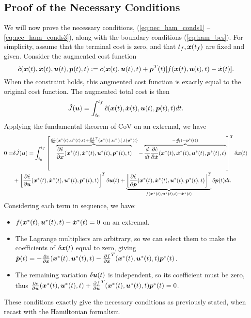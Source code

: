 \subsection{Proof of the Necessary Conditions}

We will now prove the necessary conditions, (\ref{eq:nec_ham_conds1} -- \ref{eq:nec_ham_conds3}), along with the boundary conditions (\ref{eq:ham_bcs}). For simplicity, assume that the terminal cost is zero, and that $t_f, \bm{x}(t_f)$ are fixed and given. Consider the augmented cost function 
\begin{equation}
\hat{c}(\bm{x}(t), \dot{\bm{x}}(t), \bm{u}(t), \bm{p}(t),t) \vcentcolon= c(\bm{x}(t),\bm{u}(t),t) + \bm{p}^T(t) [f(\bm{x}(t),\bm{u}(t),t) - \dot{\bm{x}}(t)].
\end{equation}
When the constraint holds, this augmented cost function is exactly equal to the original cost function. The augmented total cost is then
\begin{equation}
    \hat{J}(\bm{u}) = \int_{t_0}^{t_f} \hat{c}(\bm{x}(t), \dot{\bm{x}}(t), \bm{u}(t), \bm{p}(t),t) dt.
\end{equation}
Applying the fundamental theorem of CoV on an extremal, we have
\begin{align}
    0 = &\delta \hat{J}(\bm{u}) = \int_{t_0}^{t_f} \left[ \overbrace{\frac{\partial \hat{c}}{\partial \bm{x}}(\bm{x}^*(t), \dot{\bm{x}}^*(t), \bm{u}^*(t), \bm{p}^*(t),t)}^{\frac{\partial c}{\partial \bm{x}}(\bm{x}^*(t),  \bm{u}^*(t), t) + \frac{\partial f}{\partial \bm{x}}^T(\bm{x}^*(t),  \bm{u}^*(t), t)\bm{p}^*(t)} - \overbrace{\frac{d}{dt} \frac{\partial \hat{c}}{\partial \dot{\bm{x}}}(\bm{x}^*(t), \dot{\bm{x}}^*(t), \bm{u}^*(t), \bm{p}^*(t),t)}^{-\frac{d}{dt}(-\bm{p}^*(t))} \right]^T \delta \bm{x}(t) \\
    & + \left[ \frac{\partial \hat{c}}{\partial \bm{u}}(\bm{x}^*(t), \dot{\bm{x}}^*(t), \bm{u}^*(t), \bm{p}^*(t),t)\right]^T \delta \bm{u}(t) + \underbrace{\left[\frac{\partial \hat{c}}{\partial \bm{p}}(\bm{x}^*(t), \dot{\bm{x}}^*(t), \bm{u}^*(t), \bm{p}^*(t),t) \right]^T }_{f(\bm{x}^*(t),\bm{u}^*(t),t) - \dot{\bm{x}}^*(t)} \delta \bm{p}(t) dt \nonumber.
\end{align}
Considering each term in sequence, we have:
\begin{itemize}
    \item $f(\bm{x}^*(t),\bm{u}^*(t),t) - \dot{\bm{x}}^*(t) = 0$ on an extremal.
    \item The Lagrange multipliers are arbitrary, so we can select them to make the coefficients of $\delta \bm{x}(t)$ equal to zero, giving $\dot{\bm{p}}(t) = -\frac{\partial c}{\partial \bm{x}}(\bm{x}^*(t),  \bm{u}^*(t), t) - \frac{\partial f}{\partial \bm{x}}^T(\bm{x}^*(t),  \bm{u}^*(t), t)\bm{p}^*(t)$.
    \item The remaining variation $\delta \bm{u}(t)$ is independent, so its coefficient must be zero, thus $ \frac{\partial c}{\partial \bm{u}}(\bm{x}^*(t),  \bm{u}^*(t), t) + \frac{\partial f}{\partial \bm{u}}^T(\bm{x}^*(t),  \bm{u}^*(t), t)\bm{p}^*(t) = 0$.
\end{itemize}
These conditions exactly give the necessary conditions as previously stated, when recast with the Hamiltonian formalism.

